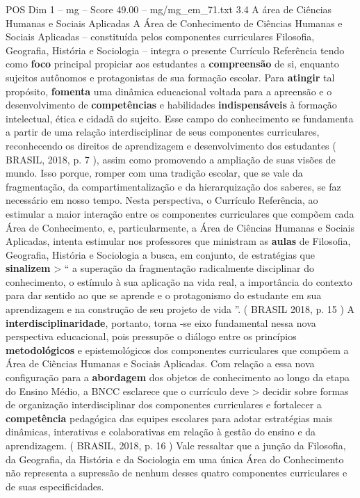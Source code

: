 \begin{textsample}{POS Dim 1 – mg – Score 49.00 – mg/mg\_em\_71.txt}  \label{ex:f1_pos_234}
3.4 A área de Ciências Humanas e Sociais Aplicadas A Área de Conhecimento de Ciências Humanas e Sociais Aplicadas – constituída pelos componentes curriculares Filosofia, Geografia, História e Sociologia – integra o presente Currículo Referência tendo como \textbf{foco} principal propiciar aos estudantes a \textbf{compreensão} de si, enquanto sujeitos autônomos e protagonistas de sua formação escolar.
Para \textbf{atingir} tal propósito, \textbf{fomenta} uma dinâmica educacional voltada para a apreensão e o desenvolvimento de \textbf{competências} e habilidades \textbf{indispensáveis} à formação intelectual, ética e cidadã do sujeito.
Esse campo do conhecimento se fundamenta a partir de uma relação interdisciplinar de seus componentes curriculares, reconhecendo os direitos de aprendizagem e desenvolvimento dos estudantes ( BRASIL, 2018, p. 7 ), assim como promovendo a ampliação de suas visões de mundo.
Isso porque, romper com uma tradição escolar, que se vale da fragmentação, da compartimentalização e da hierarquização dos saberes, se faz necessário em nosso tempo.
Nesta perspectiva, o Currículo Referência, ao estimular a maior interação entre os componentes curriculares que compõem cada Área de Conhecimento, e, particularmente, a Área de Ciências Humanas e Sociais Aplicadas, intenta estimular nos professores que ministram as \textbf{aulas} de Filosofia, Geografia, História e Sociologia a busca, em conjunto, de estratégias que \textbf{sinalizem} > “ a superação da fragmentação radicalmente disciplinar do conhecimento, o estímulo à sua aplicação na vida real, a importância do contexto para dar sentido ao que se aprende e o protagonismo do estudante em sua aprendizagem e na construção de seu projeto de vida ”. ( BRASIL 2018, p. 15 ) A \textbf{interdisciplinaridade}, portanto, torna -se eixo fundamental nessa nova perspectiva educacional, pois pressupõe o diálogo entre os princípios \textbf{metodológicos} e epistemológicos dos componentes curriculares que compõem a Área de Ciências Humanas e Sociais Aplicadas.
Com relação a essa nova configuração para a \textbf{abordagem} dos objetos de conhecimento ao longo da etapa do Ensino Médio, a BNCC esclarece que o currículo deve > decidir sobre formas de organização interdisciplinar dos componentes curriculares e fortalecer a \textbf{competência} pedagógica das equipes escolares para adotar estratégias mais dinâmicas, interativas e colaborativas em relação à gestão do ensino e da aprendizagem. ( BRASIL, 2018, p. 16 ) Vale ressaltar que a junção da Filosofia, da Geografia, da História e da Sociologia em uma única Área do Conhecimento não representa a supressão de nenhum desses quatro componentes curriculares e de suas especificidades.

\end{textsample}
